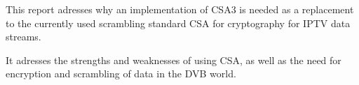 This report adresses why an implementation of CSA3 is needed as a replacement to the currently
used scrambling standard CSA for cryptography for IPTV data streams.

It adresses the strengths and weaknesses of using CSA, as well as the need for encryption and
scrambling of data in the DVB world.